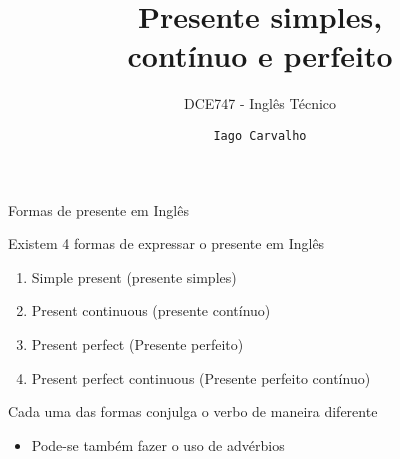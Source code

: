 \documentclass[compress,mathserif,xcolor=table]{beamer}
\title{Presente simples, \\ contínuo e perfeito}
\subtitle{DCE747 - Inglês Técnico}
\author{\texttt{Iago Carvalho}}
\institute{\texttt{Departamento de Ciência da Computação}}
\begin{document}
\begin{frame}
\titlepage

\end{frame}


\begin{frame}{Formas de presente em Inglês}

Existem 4 formas de expressar o presente em Inglês
\begin{enumerate}
    \item Simple present (presente simples)
    \item Present continuous (presente contínuo)
    \item Present perfect (Presente perfeito)
    \item Present perfect continuous (Presente perfeito contínuo)
\end{enumerate}

\vspace{0.5cm}

Cada uma das formas conjulga o verbo de maneira diferente
\begin{itemize}
    \item Pode-se também fazer o uso de advérbios
\end{itemize}
\end{frame}

\end{document}
